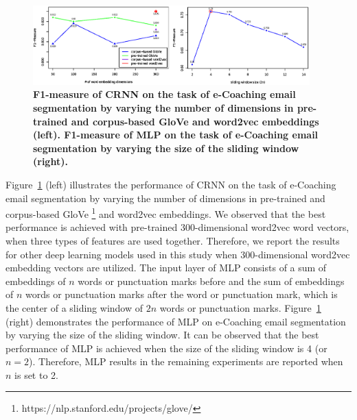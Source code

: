 \documentclass{amia}
\begin{document}
\begin{figure}[!htb]
    \centering
    \includegraphics[width=0.95\textwidth]{figures/mlp-and-vector.eps}
    \caption{\textbf{F1-measure of CRNN on the task of e-Coaching email segmentation by varying the number of dimensions in pre-trained and corpus-based GloVe and word2vec embeddings (left). F1-measure of MLP on the task of e-Coaching email segmentation by varying the size of the sliding window (right).}}
    \label{fig:embedding-dimension-mlp}
\end{figure}   

Figure~\ref{fig:embedding-dimension-mlp} (left) illustrates the performance of CRNN on the task of e-Coaching email segmentation by varying the number of dimensions in pre-trained and corpus-based GloVe \footnote{https://nlp.stanford.edu/projects/glove/} and word2vec embeddings. We observed that the best performance is achieved with pre-trained 300-dimensional word2vec word vectors, when three types of features are used together. Therefore, we report the results for other deep learning models used in this study when 300-dimensional word2vec embedding vectors are utilized. The input layer of MLP consists of a sum of embeddings of $n$ words or punctuation marks before and the sum of embeddings of $n$ words or punctuation marks after the word or punctuation mark, which is the center of a sliding window of $2n$ words or punctuation marks. Figure~\ref{fig:embedding-dimension-mlp} (right) demonstrates the performance of MLP on e-Coaching email segmentation by varying the size of the sliding window. It can be observed that the best performance of MLP is achieved when the size of the sliding window is 4 (or $n=2$). Therefore, MLP results in the remaining experiments are reported when $n$ is set to 2.
\end{document}
